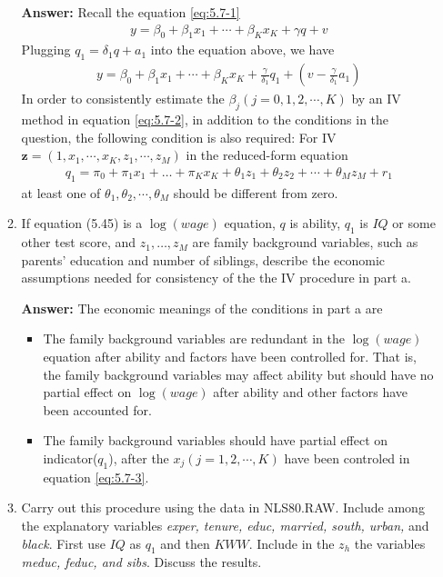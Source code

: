 \begin{enumerate}
\begin{enumerate}
        \textbf{Answer:} Recall the equation \eqref{eq:5.7-1}
        \begin{gather}
            y=\beta_{0}+\beta_{1} x_{1}+\cdots+\beta_{K} x_{K}+\gamma q+v \tag{5.45} \label{eq:5.7-1}
        \end{gather}
        Plugging $q_{1}=\delta_{1} q+a_{1}$ into the equation above, we have
        \begin{gather}
            y=\beta_{0}+\beta_{1} x_{1}+\cdots+\beta_{K} x_{K}+\frac{\gamma}{\delta_1}q_1 + \left( v-\frac{\gamma}{\delta_1}a_1 \right) \label{eq:5.7-2}
        \end{gather}
        In order to consistently estimate the $\beta_j(j = 0,1,2,\cdots,K)$ by an IV method in equation \eqref{eq:5.7-2}, in addition to the conditions in the question, the following condition is also required: For IV $\mathbf{z}=(1,x_1,\cdots,x_K,z_1,\cdots,z_M)$ in the reduced-form equation
        \begin{gather}
            q_{1}=\pi_{0}+\pi_{1} x_{1}+\ldots+\pi_{K} x_{K}+\theta_{1} z_{1}+\theta_2 z_2 + \cdots+\theta_{M} z_{M}+r_{1} \label{eq:5.7-3}
        \end{gather}
        at least one of $\theta_1, \theta_2, \cdots, \theta_M$ should be different from zero.
        
        \item If equation (5.45) is a $\log(wage)$ equation, $q$ is ability, $q_{1}$ is $I Q$ or some other test score, and $z_{1}, \ldots, z_{M}$ are family background variables, such as parents' education and number of siblings, describe the economic assumptions needed for consistency of the the IV procedure in part a.
        
        \textbf{Answer:} The economic meanings of the conditions in part a are
        \begin{itemize}
            \item The family background variables are redundant in the $\log(wage)$ equation after ability and factors have been controlled for. That is, the family background variables may affect ability but should have no partial effect on $\log(wage)$ after ability and other factors have been accounted for.
            \item The family background variables should have partial effect on indicator($q_1$), after the $x_j(j=1,2,\cdots,K)$ have been controled in equation \eqref{eq:5.7-3}.
        \end{itemize}
        
        \item Carry out this procedure using the data in NLS80.RAW. Include among the explanatory variables \textit{exper, tenure, educ, married, south, urban,} and \textit{black}. First use $I Q$ as $q_{1}$ and then $K W W .$ Include in the $z_{h}$ the variables \textit{meduc, feduc, and sibs}. Discuss the results.
        

\end{enumerate}
\end{enumerate}
